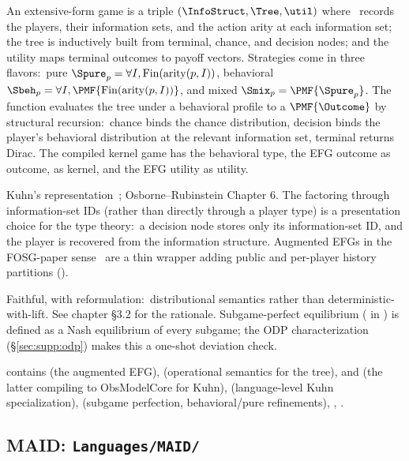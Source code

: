 \Mathematical
An extensive-form game is a triple $(\InfoStruct, \Tree, \util)$
where \InfoStruct\ records the players, their information sets,
and the action arity at each information set; the tree is
inductively built from terminal, chance, and decision nodes; and
the utility maps terminal outcomes to payoff vectors.  Strategies
come in three flavors:\ pure
$\Spure_p = \forall I, \mathrm{Fin}(\mathrm{arity}(p, I))$,
behavioral $\Sbeh_p = \forall I, \PMF{\mathrm{Fin}(\mathrm{arity}(p, I))}$,
and mixed $\Smix_p = \PMF{\Spure_p}$.  The function 
evaluates the tree under a behavioral profile to a $\PMF{\Outcome}$
by structural recursion:\ chance binds the chance distribution,
decision binds the player's behavioral distribution at the
relevant information set, terminal returns Dirac.  The compiled
kernel game has  the behavioral type, the EFG outcome
as outcome,  as kernel, and the EFG utility as utility.

\Textbook
Kuhn's representation~\citep{Kuhn1953}; Osborne–Rubinstein Chapter
6.  The  factoring through information-set IDs
(rather than directly through a player type) is a presentation
choice for the type theory:\ a decision node stores only its
information-set ID, and the player is recovered from the
information structure.  Augmented EFGs in the FOSG-paper
sense~\citep{Kovarik2022} are a thin wrapper adding public and
per-player history partitions ().

\Faithfulness
Faithful, with reformulation:\ distributional semantics rather
than deterministic-with-lift.  See chapter §3.2 for the
rationale.  Subgame-perfect equilibrium
( in
) is defined as a Nash
equilibrium of every subgame; the ODP characterization
(\S\ref{sec:supp:odp}) makes this a one-shot deviation check.

\Variants
{} contains  (the augmented
EFG),  (operational semantics for the tree),
 and  (the latter compiling
to ObsModelCore for Kuhn),  (language-level Kuhn
specialization),  (subgame perfection,
behavioral/pure refinements), , .

\subsection{MAID: \texttt{Languages/MAID/}}
\label{sec:supp:maid}\label{def:MAID.MAIDGame}

